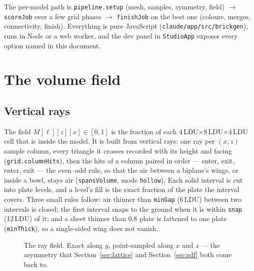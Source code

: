 \documentclass[10pt,a4paper]{article}
\newcommand{\code}[1]{\texttt{\small #1}}
\newcommand{\ldu}{\,LDU}
\begin{document}
The per-model path is \code{pipeline.setup} (mesh, samples, symmetry, field) $\to$ \code{scoreJob} over a few grid phases $\to$
\code{finishJob} on the best one (colours, merges, connectivity, finish). Everything is pure JavaScript (\code{claude/app/src/brickgen}),
runs in Node or a web worker, and the dev panel in \code{StudioApp} exposes every option named in this document.

\section{The volume field}
\subsection{Vertical rays}
The field $M[\ell][z][x]\in[0,1]$ is the fraction of each 4\ldu$\times$8\ldu$\times$4\ldu{} cell that is inside the model. It is
built from vertical rays: one ray per $(x,z)$ sample column, every triangle it crosses recorded with its height and facing
(\code{grid.columnHits}), then the hits of a column paired in order --- enter, exit, enter, exit --- the even--odd rule, so that the
air between a biplane's wings, or inside a bowl, stays air (\code{spansVolume}, mode \code{hollow}). Each solid interval is cut
into plate levels, and a level's fill is the exact fraction of the plate the interval covers. Three small rules follow:
air thinner than \code{minGap} (6\ldu) between two intervals is closed; the first interval snaps to the ground when it is within
\code{snap} (12\ldu) of it; and a sheet thinner than 0.8 plate is fattened to one plate (\code{minThick}), so a single-sided wing
does not vanish.

\begin{figure}[h]
\centering
{}
\caption{The ray field. Exact along $y$, point-sampled along $x$ and $z$ --- the asymmetry that Section~\ref{sec:lattice} and
Section~\ref{sec:sdf} both come back to.}
\end{figure}
\end{document}

